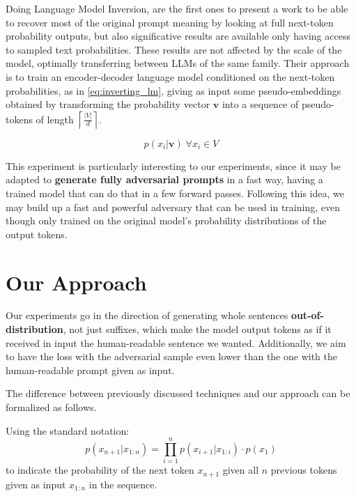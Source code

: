 \documentclass[../thesis]{subfiles}
\begin{document}
Doing Language Model Inversion, \citeauthor{morris2023languagemodelinversion} are the first ones to present a work to be able to recover most of the original prompt meaning by looking at full next-token probability outputs, but also significative results are available only having access to sampled text probabilities.
These results are not affected by the scale of the model, optimally transferring between LLMs of the same family.
Their approach is to train an encoder-decoder language model conditioned on the next-token probabilities, as in \cref{eq:inverting_lm}, giving as input some pseudo-embeddings obtained by transforming the probability vector $\mathbf{v}$ into a sequence of pseudo-tokens of length $\left\lceil \frac{|V|}{d} \right\rceil$.

\begin{equation}
    p(x_i | \mathbf{v}) \; \forall x_i \in V
\label{eq:inverting_lm}
\end{equation}

This experiment is particularly interesting to our experiments, since it may be adapted to \textbf{generate fully adversarial prompts} in a fast way, having a trained model that can do that in a few forward passes.
Following this idea, we may build up a fast and powerful adversary that can be used in training, even though only trained on the original model's probability distributions of the output tokens.

\section{Our Approach}
Our experiments go in the direction of generating whole sentences \textbf{out-of-distribution}, not just suffixes, which make the model output tokens as if it received in input the human-readable sentence we wanted.
Additionally, we aim to have the loss with the adversarial sample even lower than the one with the human-readable prompt given as input.

The difference between previously discussed techniques and our approach can be formalized as follows.

Using the standard notation:
\begin{equation}
    p(x_{n+1} | x_{1:n}) = \prod_{i=1}^n p(x_{i+1} | x_{1:i}) \cdot p(x_1)
\label{eq:next_token_probability}
\end{equation}
to indicate the probability of the next token $x_{n+1}$ given all $n$ previous tokens given as input $x_{1:n}$ in the sequence.
\end{document}

